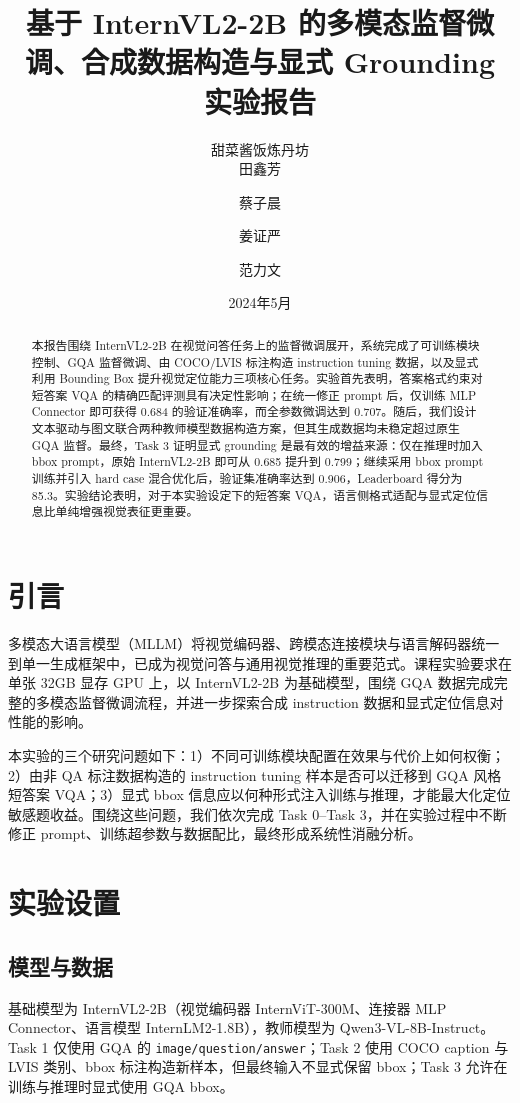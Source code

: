 \documentclass[9pt,twocolumn,a4paper]{ctexart}
\title{\textbf{基于 InternVL2-2B 的多模态监督微调、合成数据构造与显式 Grounding 实验报告}}
\author{甜菜酱饭炼丹坊\\田鑫芳 \and 蔡子晨 \and 姜证严 \and 范力文}
\date{2024年5月}
\begin{document}
\maketitle
\thispagestyle{empty}

\begin{abstract}
本报告围绕 InternVL2-2B 在视觉问答任务上的监督微调展开，系统完成了可训练模块控制、GQA 监督微调、由 COCO/LVIS 标注构造 instruction tuning 数据，以及显式利用 Bounding Box 提升视觉定位能力三项核心任务。实验首先表明，答案格式约束对短答案 VQA 的精确匹配评测具有决定性影响；在统一修正 prompt 后，仅训练 MLP Connector 即可获得 0.684 的验证准确率，而全参数微调达到 0.707。随后，我们设计文本驱动与图文联合两种教师模型数据构造方案，但其生成数据均未稳定超过原生 GQA 监督。最终，Task 3 证明显式 grounding 是最有效的增益来源：仅在推理时加入 bbox prompt，原始 InternVL2-2B 即可从 0.685 提升到 0.799；继续采用 bbox prompt 训练并引入 hard case 混合优化后，验证集准确率达到 0.906，Leaderboard 得分为 85.3。实验结论表明，对于本实验设定下的短答案 VQA，语言侧格式适配与显式定位信息比单纯增强视觉表征更重要。
\end{abstract}

\section{引言}
多模态大语言模型（MLLM）将视觉编码器、跨模态连接模块与语言解码器统一到单一生成框架中，已成为视觉问答与通用视觉推理的重要范式。课程实验要求在单张 32GB 显存 GPU 上，以 InternVL2-2B 为基础模型，围绕 GQA 数据完成完整的多模态监督微调流程，并进一步探索合成 instruction 数据和显式定位信息对性能的影响。

本实验的三个研究问题如下：1）不同可训练模块配置在效果与代价上如何权衡；2）由非 QA 标注数据构造的 instruction tuning 样本是否可以迁移到 GQA 风格短答案 VQA；3）显式 bbox 信息应以何种形式注入训练与推理，才能最大化定位敏感题收益。围绕这些问题，我们依次完成 Task 0--Task 3，并在实验过程中不断修正 prompt、训练超参数与数据配比，最终形成系统性消融分析。

\section{实验设置}
\subsection{模型与数据}
基础模型为 InternVL2-2B（视觉编码器 InternViT-300M、连接器 MLP Connector、语言模型 InternLM2-1.8B），教师模型为 Qwen3-VL-8B-Instruct。Task 1 仅使用 GQA 的 \texttt{image/question/answer}；Task 2 使用 COCO caption 与 LVIS 类别、bbox 标注构造新样本，但最终输入不显式保留 bbox；Task 3 允许在训练与推理时显式使用 GQA bbox。
\end{document}
